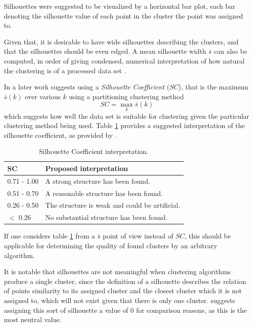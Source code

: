Silhouettes were suggested to be visualized by a 
horizontal bar plot, each bar denoting the silhouette value of 
each point in the cluster the point was assigned to. 

Given that, it is desirable to have wide silhouettes describing the
clusters, and that the silhouettes should be even edged. A mean 
silhouette width $ \bar{s} $ can also be computed, in order of 
giving condensed, numerical interpretation of how natural the 
clustering is of a processed data set \cite{silhouettes}.

In a later work \citeauthor{finding-groups-in-data} suggests using
a \emph{Silhouette Coefficient} ($ SC $), that is the maximum 
$ \bar{s}(k) $ over various $ k $ using a partitioning clustering 
method
\begin{equation}
    \label{eq:silhouette_coefficient}
    SC = \max_{ k } \bar{s}(k)
\end{equation}
which suggests how well the data set is suitable for clustering 
given the particular clustering method being used.
Table \ref{table:silhouette-interpretation} provides a suggested
interpretation of the silhouette coefficient, as provided by
\citeauthor{finding-groups-in-data} \cite{finding-groups-in-data}.

\begin{table}
    \centering
    {\begin{tabular}{ | l | l | }
        \hline
        SC & Proposed interpretation \\
        \hline
        0.71 - 1.00 & A strong structure has been found.\\
        0.51 - 0.70 & A reasonable structure has been found.\\
        0.26 - 0.50 & The structure is weak and could be 
                      artificial.\\
        $<$    0.26 & No substantial structure has been found.\\
        \hline
    \end{tabular}}
    \caption{Silhouette Coefficient interpretation.} 
    \label{table:silhouette-interpretation}
\end{table}

If one considers table \ref{table:silhouette-interpretation} 
from a $ \bar{s} $ point of view instead of $ SC $, this should 
be applicable for determining the quality of found clusters by 
an arbitrary algorithm.

It is notable that silhouettes are not meaningful when clustering 
algorithms produce a single cluster, since the definition of a 
silhouette describes the relation of points similarity to its 
assigned cluster and the closest cluster which it is not assigned
to, which will not exist given that there is only one cluster. 
\citeauthor{silhouettes} suggests assigning this sort of
silhouette a value of 0 for comparison reasons, as this is the 
most neutral value. 

